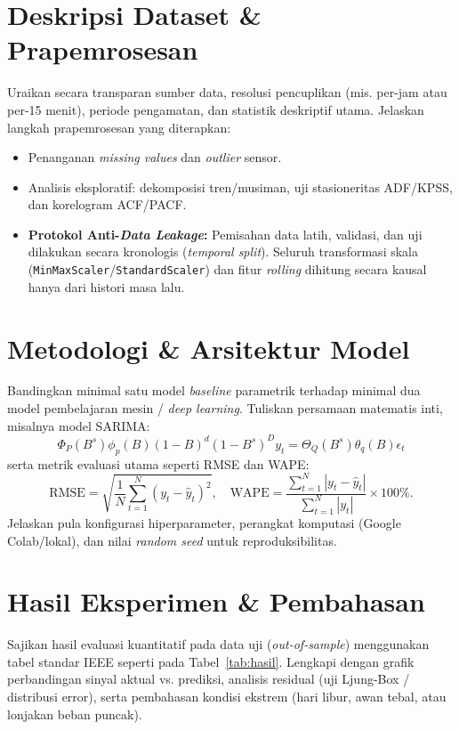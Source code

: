 \documentclass[conference]{IEEEtran}
\begin{document}
\section{Deskripsi Dataset \& Prapemrosesan}
Uraikan secara transparan sumber data, resolusi pencuplikan (mis. per-jam atau per-15 menit), periode pengamatan, dan statistik deskriptif utama. Jelaskan langkah prapemrosesan yang diterapkan:
\begin{itemize}
    \item Penanganan \textit{missing values} dan \textit{outlier} sensor.
    \item Analisis eksploratif: dekomposisi tren/musiman, uji stasioneritas ADF/KPSS, dan korelogram ACF/PACF.
    \item \textbf{Protokol Anti-\textit{Data Leakage}:} Pemisahan data latih, validasi, dan uji dilakukan secara kronologis (\textit{temporal split}). Seluruh transformasi skala (\texttt{MinMaxScaler}/\texttt{StandardScaler}) dan fitur \textit{rolling} dihitung secara kausal hanya dari histori masa lalu.
\end{itemize}

\section{Metodologi \& Arsitektur Model}
Bandingkan minimal satu model \textit{baseline} parametrik terhadap minimal dua model pembelajaran mesin / \textit{deep learning}. Tuliskan persamaan matematis inti, misalnya model SARIMA:
\begin{equation}
\Phi_P(B^s)\phi_p(B)(1-B)^d(1-B^s)^D y_t = \Theta_Q(B^s)\theta_q(B)\epsilon_t
\label{eq:sarima}
\end{equation}
serta metrik evaluasi utama seperti RMSE dan WAPE:
\begin{equation}
\text{RMSE} = \sqrt{\frac{1}{N}\sum_{t=1}^{N}(y_t - \hat{y}_t)^2}, \quad
\text{WAPE} = \frac{\sum_{t=1}^{N}|y_t - \hat{y}_t|}{\sum_{t=1}^{N}|y_t|} \times 100\%.
\label{eq:metrics}
\end{equation}
Jelaskan pula konfigurasi hiperparameter, perangkat komputasi (Google Colab/lokal), dan nilai \textit{random seed} untuk reproduksibilitas.

\section{Hasil Eksperimen \& Pembahasan}
Sajikan hasil evaluasi kuantitatif pada data uji (\textit{out-of-sample}) menggunakan tabel standar IEEE seperti pada Tabel~\ref{tab:hasil}. Lengkapi dengan grafik perbandingan sinyal aktual vs. prediksi, analisis residual (uji Ljung-Box / distribusi error), serta pembahasan kondisi ekstrem (hari libur, awan tebal, atau lonjakan beban puncak).
\end{document}
